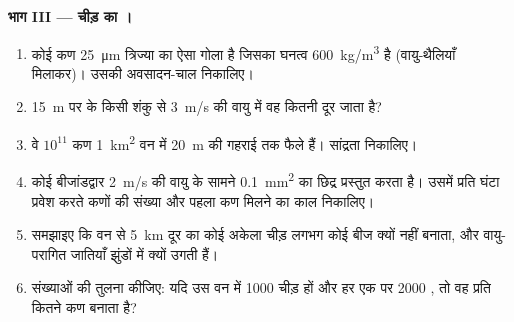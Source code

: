 \begin{problem}
\medskip
\noindent\textbf{भाग III --- चीड़ का ।}
\begin{enumerate}[resume]
  \item कोई  कण \qty{25}{\micro m} त्रिज्या का ऐसा गोला है जिसका
         घनत्व \qty{600}{kg/m^3} है (वायु-थैलियाँ मिलाकर)।
        उसकी अवसादन-चाल निकालिए।
  \item \qty{15}{m} पर के किसी शंकु से \qty{3}{m/s} की वायु में वह
        कितनी दूर जाता है?
  \item वे $10^{11}$ कण \qty{1}{km^2} वन में \qty{20}{m} की गहराई तक
        फैले हैं। सांद्रता निकालिए।
  \item कोई बीजांडद्वार \qty{2}{m/s} की वायु के सामने
        \qty{0.1}{mm^2} का छिद्र प्रस्तुत करता है। उसमें प्रति घंटा
        प्रवेश करते कणों की संख्या और पहला कण मिलने का काल निकालिए।
  \item समझाइए कि वन से \qty{5}{km} दूर का कोई अकेला चीड़ लगभग कोई बीज
        क्यों नहीं बनाता, और वायु-परागित जातियाँ झुंडों में क्यों
        उगती हैं।
  \item संख्याओं की तुलना कीजिए: यदि उस वन में \num{1000} चीड़ हों और
        हर एक पर \num{2000} , तो वह प्रति  कितने  कण
        बनाता है?
\end{enumerate}


\end{problem}
